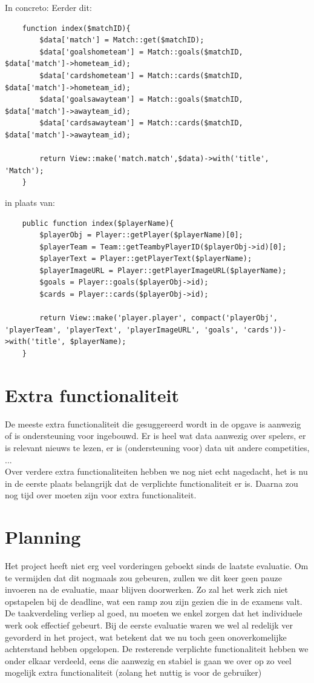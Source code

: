 \documentclass[11pt, a4paper]{article}
\begin{document}
In concreto:
Eerder dit:
\begin{lstlisting}
	function index($matchID){
		$data['match'] = Match::get($matchID);
		$data['goalshometeam'] = Match::goals($matchID, $data['match']->hometeam_id);
		$data['cardshometeam'] = Match::cards($matchID, $data['match']->hometeam_id);
		$data['goalsawayteam'] = Match::goals($matchID, $data['match']->awayteam_id);
		$data['cardsawayteam'] = Match::cards($matchID, $data['match']->awayteam_id);
		
		return View::make('match.match',$data)->with('title', 'Match');
	}
\end{lstlisting} 

in plaats van:
\begin{lstlisting}
	public function index($playerName){
		$playerObj = Player::getPlayer($playerName)[0];
		$playerTeam = Team::getTeambyPlayerID($playerObj->id)[0];		
		$playerText = Player::getPlayerText($playerName);
		$playerImageURL = Player::getPlayerImageURL($playerName);
		$goals = Player::goals($playerObj->id);
		$cards = Player::cards($playerObj->id);
			
		return View::make('player.player', compact('playerObj', 'playerTeam', 'playerText', 'playerImageURL', 'goals', 'cards'))->with('title', $playerName);
	}
\end{lstlisting} 

\section{Extra functionaliteit}
De meeste extra functionaliteit die gesuggereerd wordt in de opgave is aanwezig of is ondersteuning voor ingebouwd. Er is heel wat data aanwezig over spelers, er is relevant nieuws te lezen, er is (ondersteuning voor) data uit andere competities, ... \\ Over verdere extra functionaliteiten hebben we nog niet echt nagedacht, het is nu in de eerste plaats belangrijk dat de verplichte functionaliteit er is. Daarna zou nog tijd over moeten zijn voor extra functionaliteit.

\section{Planning}
Het project heeft niet erg veel vorderingen geboekt sinds de laatste evaluatie. Om te vermijden dat dit nogmaals zou gebeuren, zullen we dit keer geen pauze invoeren na de evaluatie, maar blijven doorwerken. Zo zal het werk zich niet opstapelen bij de deadline, wat een ramp zou zijn gezien die in de examens valt. De taakverdeling verliep al goed, nu moeten we enkel zorgen dat het individuele werk ook effectief gebeurt. Bij de eerste evaluatie waren we wel al redelijk ver gevorderd in het project, wat betekent dat we nu toch geen onoverkomelijke achterstand hebben opgelopen. De resterende verplichte functionaliteit hebben we onder elkaar verdeeld, eens die aanwezig en stabiel is gaan we over op zo veel mogelijk extra functionaliteit (zolang het nuttig is voor de gebruiker)
\end{document}
